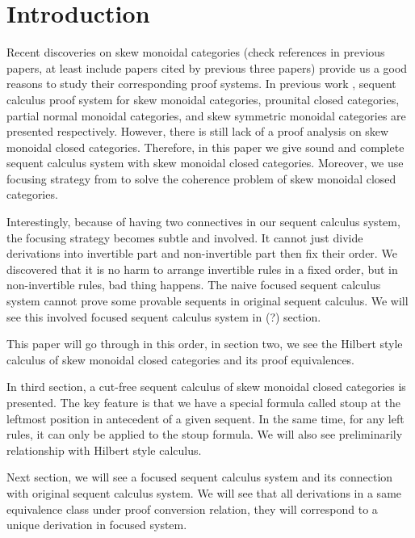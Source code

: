 \documentclass[submission,copyright,creativecommons]{eptcs}
\begin{document}
\section{Introduction}
Recent discoveries on skew monoidal categories \cite{szlachanyi:skew-monoidal:2012} \cite{lack:skew:2012} \cite{lack:triangulations:2014} (check references in previous papers, at least include papers cited by previous three papers) provide us a good reasons to study their corresponding proof systems.
In previous work \cite{uustalu:sequent:2018} \cite{uustalu:deductive:nodate} \cite{uustalu:proof:nodate} \cite{veltri:coherence:2021}, sequent calculus proof system for skew monoidal categories, prounital closed categories, partial normal monoidal categories, and skew symmetric monoidal categories are presented respectively.
However, there is still lack of a proof analysis on skew monoidal closed categories.
Therefore, in this paper we give sound and complete sequent calculus system with skew monoidal closed categories.
Moreover, we use focusing strategy from \cite{andreoli:logic:1992} to solve the coherence problem of skew monoidal closed categories.

Interestingly, because of having two connectives in our sequent calculus system, the focusing strategy becomes subtle and involved.
It cannot just divide derivations into invertible part and non-invertible part then fix their order.
We discovered that it is no harm to arrange invertible rules in a fixed order, but in non-invertible rules, bad thing happens.
The naive focused sequent calculus system cannot prove some provable sequents in original sequent calculus.
We will see this involved focused sequent calculus system in (?) section.

This paper will go through in this order, in section two, we see the Hilbert style calculus of skew monoidal closed categories and its proof equivalences.

In third section, a cut-free sequent calculus of skew monoidal closed categories is presented.
The key feature is that we have a special formula called stoup at the leftmost position in antecedent of a given sequent.
In the same time, for any left rules, it can only be applied to the stoup formula.
We will also see preliminarily relationship with Hilbert style calculus.

Next section, we will see a focused sequent calculus system and its connection with original sequent calculus system.
We will see that all derivations in a same equivalence class under proof conversion relation, they will correspond to a unique derivation in focused system.
\end{document}
